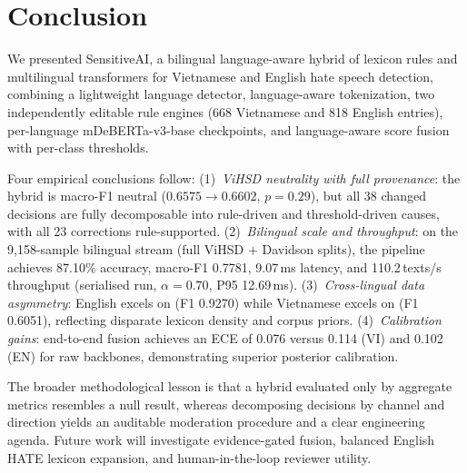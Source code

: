 \section{Conclusion}
\label{sec:conclusion}

We presented SensitiveAI, a bilingual language-aware hybrid of lexicon rules and multilingual transformers for Vietnamese and English hate speech detection, combining a lightweight language detector, language-aware tokenization, two independently editable rule engines (668 Vietnamese and 818 English entries), per-language mDeBERTa-v3-base checkpoints, and language-aware score fusion with per-class thresholds.

Four empirical conclusions follow:
(1)~\emph{ViHSD neutrality with full provenance}: the hybrid is macro-F1 neutral ($0.6575 \to 0.6602$, $p=0.29$), but all 38 changed decisions are fully decomposable into rule-driven and threshold-driven causes, with all 23 corrections rule-supported.
(2)~\emph{Bilingual scale and throughput}: on the 9{,}158-sample bilingual stream (full ViHSD $+$ Davidson splits), the pipeline achieves 87.10\% accuracy, macro-F1 0.7781, 9.07\,ms latency, and 110.2\,texts/s throughput (serialised run, $\alpha=0.70$, P95 12.69\,ms).
(3)~\emph{Cross-lingual data asymmetry}: English excels on \off{} (F1 0.9270) while Vietnamese excels on \hate{} (F1 0.6051), reflecting disparate lexicon density and corpus priors.
(4)~\emph{Calibration gains}: end-to-end fusion achieves an ECE of 0.076 versus 0.114 (VI) and 0.102 (EN) for raw backbones, demonstrating superior posterior calibration.

The broader methodological lesson is that a hybrid evaluated only by aggregate metrics resembles a null result, whereas decomposing decisions by channel and direction yields an auditable moderation procedure and a clear engineering agenda. Future work will investigate evidence-gated fusion, balanced English HATE lexicon expansion, and human-in-the-loop reviewer utility.
